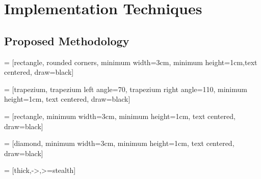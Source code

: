 \chapter{Implementation Techniques}


\section{Proposed Methodology}



 = [rectangle, rounded corners, minimum width=3cm, minimum height=1cm,text centered, draw=black]

 = [trapezium, trapezium left angle=70, trapezium right angle=110, minimum height=1cm, text centered, draw=black]

 = [rectangle, minimum width=3cm, minimum height=1cm, text centered, draw=black]

 = [diamond, minimum width=3cm, minimum height=1cm, text centered, draw=black]

 = [thick,->,>=stealth]

